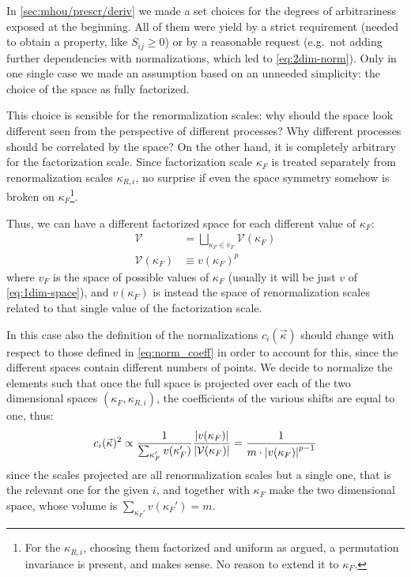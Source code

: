 In \cref{sec:mhou/prescr/deriv} we made a set choices for the degrees of
arbitrariness exposed at the beginning.
All of them were yield by a strict requirement (needed to obtain a property,
like $S_{ij} \ge 0$) or by a reasonable request (e.g.\ not adding further
dependencies with normalizations, which led to \cref{eq:2dim-norm}).
Only in one single case we made an assumption based on an unneeded simplicity:
the choice of the space as fully factorized.

This choice is sensible for the renormalization scales: why should the space
look different seen from the perspective of different processes? Why different
processes should be correlated by the space?
On the other hand, it is completely arbitrary for the factorization scale.
Since factorization scale $\kappa_F$ is treated separately from renormalization
scales $\kappa_{R,i}$, no surprise if even the space symmetry somehow is broken
on $\kappa_F$\footnote{
    For the $\kappa_{R,i}$, choosing them factorized and uniform as argued, a
    permutation invariance is present, and makes sense.
    No reason to extend it to $\kappa_F$.
}.

Thus, we can have a different factorized space for each different value of $\kappa_F$:
\begin{align}
    \label{eq:sliced-space}
    \mathcal{V} &= \bigsqcup_{\kappa_F \in v_F} \mathcal{V}(\kappa_F)\\
    \label{eq:1f-factorized}
    \mathcal{V}(\kappa_F) &\equiv v(\kappa_F)^p
\end{align}
where $v_F$ is the space of possible values of $\kappa_F$ (usually it will be
just $v$ of \cref{eq:1dim-space}), and $v(\kappa_F)$ is instead the space of
renormalization scales related to that single value of the factorization scale.

In this case also the definition of the normalizations $c_i(\vec{\kappa})$
should change with respect to those defined in \cref{eq:norm_coeff} in order to
account for this, since the different spaces contain different numbers of
points.
We decide to normalize the elements such that once the full space is projected
over each of the two dimensional spaces $(\kappa_F, \kappa_{R,i})$, the
coefficients of the various shifts are equal to one, thus:
\begin{equation}
    \label{eq:sliced-norm}
    c_i(\vec{\kappa})^2 \propto \frac{1}{\sum_{\kappa_F'}v(\kappa_F')} \frac{\abs{v(\kappa_F)}}{\abs{\mathcal{V}(\kappa_F)}}
        = \frac{1}{m \cdot \abs{v(\kappa_F)}^{p-1}}
\end{equation}
since the scales projected are all renormalization scales but a single one,
that is the relevant one for the given $i$, and together with $\kappa_F$ make
the two dimensional space, whose volume is $\sum_{\kappa_F'}v(\kappa_F') = m$.
